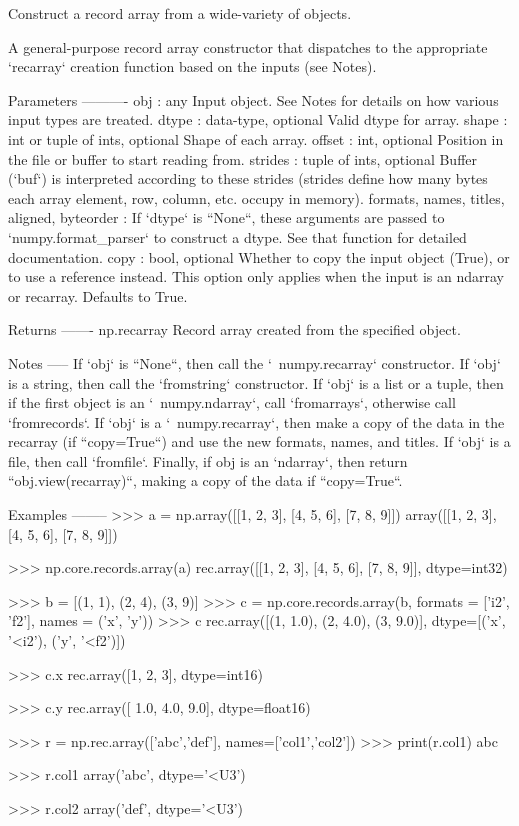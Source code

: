 \begin{DoxyVerb}Construct a record array from a wide-variety of objects.

A general-purpose record array constructor that dispatches to the
appropriate `recarray` creation function based on the inputs (see Notes).

Parameters
----------
obj : any
    Input object. See Notes for details on how various input types are
    treated.
dtype : data-type, optional
    Valid dtype for array.
shape : int or tuple of ints, optional
    Shape of each array.
offset : int, optional
    Position in the file or buffer to start reading from.
strides : tuple of ints, optional
    Buffer (`buf`) is interpreted according to these strides (strides
    define how many bytes each array element, row, column, etc.
    occupy in memory).
formats, names, titles, aligned, byteorder :
    If `dtype` is ``None``, these arguments are passed to
    `numpy.format_parser` to construct a dtype. See that function for
    detailed documentation.
copy : bool, optional
    Whether to copy the input object (True), or to use a reference instead.
    This option only applies when the input is an ndarray or recarray.
    Defaults to True.

Returns
-------
np.recarray
    Record array created from the specified object.

Notes
-----
If `obj` is ``None``, then call the `~numpy.recarray` constructor. If
`obj` is a string, then call the `fromstring` constructor. If `obj` is a
list or a tuple, then if the first object is an `~numpy.ndarray`, call
`fromarrays`, otherwise call `fromrecords`. If `obj` is a
`~numpy.recarray`, then make a copy of the data in the recarray
(if ``copy=True``) and use the new formats, names, and titles. If `obj`
is a file, then call `fromfile`. Finally, if obj is an `ndarray`, then
return ``obj.view(recarray)``, making a copy of the data if ``copy=True``.

Examples
--------
>>> a = np.array([[1, 2, 3], [4, 5, 6], [7, 8, 9]])
array([[1, 2, 3],
       [4, 5, 6],
       [7, 8, 9]])

>>> np.core.records.array(a)
rec.array([[1, 2, 3],
           [4, 5, 6],
           [7, 8, 9]],
    dtype=int32)

>>> b = [(1, 1), (2, 4), (3, 9)]
>>> c = np.core.records.array(b, formats = ['i2', 'f2'], names = ('x', 'y'))
>>> c
rec.array([(1, 1.0), (2, 4.0), (3, 9.0)],
          dtype=[('x', '<i2'), ('y', '<f2')])

>>> c.x
rec.array([1, 2, 3], dtype=int16)

>>> c.y
rec.array([ 1.0,  4.0,  9.0], dtype=float16)

>>> r = np.rec.array(['abc','def'], names=['col1','col2'])
>>> print(r.col1)
abc

>>> r.col1
array('abc', dtype='<U3')

>>> r.col2
array('def', dtype='<U3')
\end{DoxyVerb}
